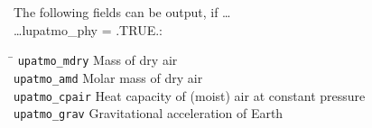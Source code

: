 The following fields can be output, if \ldots \\

\ldots lupatmo\_phy = .TRUE.:
\begin{tabbing}
\hspace*{0.4\textwidth} \= \kill
\texttt{upatmo\_mdry}      \>  Mass of dry air \\
\texttt{upatmo\_amd}       \>  Molar mass of dry air \\
\texttt{upatmo\_cpair}     \>  Heat capacity of (moist) air at constant pressure \\
\texttt{upatmo\_grav}      \>  Gravitational acceleration of Earth 
\end{tabbing}

